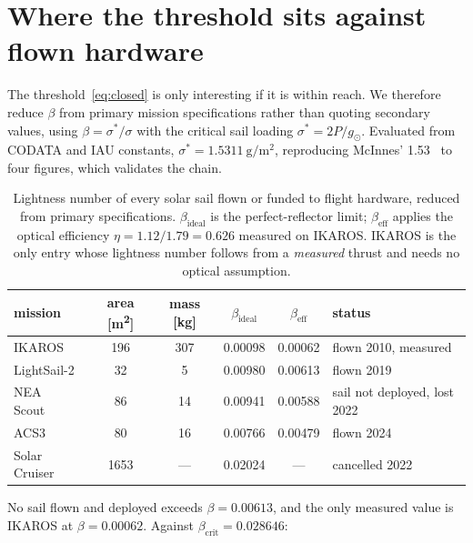 \documentclass[11pt,a4paper]{article}
\begin{document}
\section{Where the threshold sits against flown hardware}\label{sec:tech}

The threshold~\eqref{eq:closed} is only interesting if it is within reach. We
therefore reduce $\beta$ from primary mission specifications rather than quoting
secondary values, using $\beta=\sigma^{\ast}/\sigma$ with the critical sail
loading $\sigma^{\ast}=2P/g_{\odot}$. Evaluated from CODATA and IAU constants,
$\sigma^{\ast}=\SI{1.5311}{\gram\per\metre\squared}$, reproducing McInnes'
\num{1.53}~\cite{mcinnes1999} to four figures, which validates the chain.

\begin{table}[t]
  \centering
  \caption{Lightness number of every solar sail flown or funded to flight
  hardware, reduced from primary specifications. $\beta_{\mathrm{ideal}}$ is the
  perfect-reflector limit; $\beta_{\mathrm{eff}}$ applies the optical efficiency
  $\eta=1.12/1.79=0.626$ measured on IKAROS. IKAROS is the only entry whose
  lightness number follows from a \emph{measured} thrust and needs no optical
  assumption.}
  \label{tab:tech}
  \begin{tabular}{lccccl}
    \toprule
    mission & area [\si{\metre\squared}] & mass [\si{\kilogram}] &
    $\beta_{\mathrm{ideal}}$ & $\beta_{\mathrm{eff}}$ & status \\
    \midrule
    IKAROS~\cite{mori2010,tsuda2011}   & 196  & 307 & \num{0.00098} & \num{0.00062} & flown 2010, measured \\
    LightSail-2~\cite{spencer2021}     & 32   & 5   & \num{0.00980} & \num{0.00613} & flown 2019 \\
    NEA Scout~\cite{mcnutt2014}        & 86   & 14  & \num{0.00941} & \num{0.00588} & sail not deployed, lost 2022 \\
    ACS3~\cite{acs3}                   & 80   & 16  & \num{0.00766} & \num{0.00479} & flown 2024 \\
    Solar Cruiser                      & 1653 & --- & \num{0.02024} & ---           & cancelled 2022 \\
    \bottomrule
  \end{tabular}
\end{table}

No sail flown and deployed exceeds $\beta=\num{0.00613}$, and the only measured
value is IKAROS at $\beta=\num{0.00062}$. Against
$\beta_{\mathrm{crit}}=\num{0.028646}$:
\end{document}
